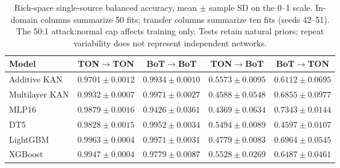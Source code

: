 \begin{table}[t]
\centering
\caption{Rich-space single-source balanced accuracy, mean $\pm$ sample SD on the 0--1 scale. In-domain columns summarize 50 fits; transfer columns summarize ten fits (seeds 42--51). The 50:1 attack:normal cap affects training only. Tests retain natural priors; repeat variability does not represent independent networks.}
\label{tab:supp-cross-dispersion}
\footnotesize
\setlength{\tabcolsep}{6pt}
\begin{tabular}{lcccc}
\toprule
Model & TON$\to$TON & BoT$\to$BoT & TON$\to$BoT & BoT$\to$TON \\
\midrule
Additive KAN & $0.9701 \pm 0.0012$ & $0.9934 \pm 0.0010$ & $0.5573 \pm 0.0095$ & $0.6112 \pm 0.0695$ \\
Multilayer KAN & $0.9932 \pm 0.0007$ & $0.9971 \pm 0.0027$ & $0.4588 \pm 0.0548$ & $0.6855 \pm 0.0977$ \\
MLP16 & $0.9879 \pm 0.0016$ & $0.9426 \pm 0.0361$ & $0.4369 \pm 0.0634$ & $0.7343 \pm 0.0144$ \\
DT5 & $0.9828 \pm 0.0015$ & $0.9952 \pm 0.0034$ & $0.5494 \pm 0.0089$ & $0.4597 \pm 0.0107$ \\
LightGBM & $0.9963 \pm 0.0004$ & $0.9971 \pm 0.0031$ & $0.4779 \pm 0.0083$ & $0.6964 \pm 0.0545$ \\
XGBoost & $0.9947 \pm 0.0004$ & $0.9779 \pm 0.0087$ & $0.5528 \pm 0.0269$ & $0.6487 \pm 0.0461$ \\
\bottomrule
\end{tabular}
\end{table}
